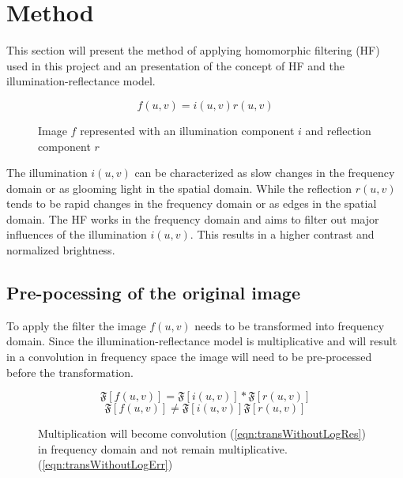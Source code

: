 \section{Method}
This section will present the method of applying homomorphic filtering (HF) used in this project and an presentation of the concept of HF and the illumination-reflectance model.

\begin{figure}[h!]
\begin{equation}
  f(u,v) = i(u,v) r(u,v)
  \label{eqn:im1}
\end{equation}
\caption{Image $f$ represented with an illumination component $i$ and reflection component $r$}
\end{figure}
The illumination $i(u,v)$ can be characterized as slow changes in the frequency domain or as glooming light in the spatial domain. While the reflection $r(u,v)$ tends to be rapid changes in the frequency domain or as edges in the spatial domain. The HF works in the frequency domain and aims to filter out major influences of the illumination $i(u,v)$. This results in a higher contrast and normalized brightness. \\

\subsection{Pre-pocessing of the original image}
To apply the filter the image $f(u,v)$ needs to be transformed into frequency domain. Since the illumination-reflectance model is multiplicative and will result in a convolution in frequency space the image will need to be pre-processed before the transformation.

\begin{figure}[h!]
\begin{equation}
  \mathfrak{F}[f(u,v)] = \mathfrak{F}[i(u,v)] \ast \mathfrak{F}[r(u,v)] 
  \label{eqn:transWithoutLogRes}
\end{equation}
\begin{equation}
  \mathfrak{F}[f(u,v)] \neq \mathfrak{F}[i(u,v)] \mathfrak{F}[r(u,v)] 
  \label{eqn:transWithoutLogErr}
\end{equation}
\caption{Multiplication will become convolution (\ref{eqn:transWithoutLogRes}) in frequency domain and not remain multiplicative.(\ref{eqn:transWithoutLogErr})}
\end{figure}

